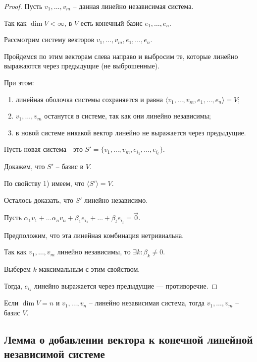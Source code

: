 \begin{proof}
    Пусть $v_1, \dots, v_m$ -- данная линейно независимая система.

    Так как $\dim V < \infty$, в $V$ есть конечный базис $e_1, \dots, e_n$.

    Рассмотрим систему векторов $v_1, \dots, v_m, e_1, \dots, e_n$.

    Пройдемся по этим векторам слева направо и выбросим те, которые линейно выражаются через предыдущие (не выброшенные).

    При этом:
    \begin{enumerate}[nosep, label=\arabic*)]
    \item линейная оболочка системы сохраняется и равна $\langle v_1, \dots, v_m, e_1, \dots, e_n \rangle = V$;
    \item $v_1, \dots, v_m$ останутся в системе, так как они линейно независимы;
    \item в новой системе никакой вектор линейно не выражается через предыдущие.
    \end{enumerate}

    Пусть новая система - это $S' = \{v_1, \dots, v_m, e_{i_1}, \dots, e_{i_t}\}$.

    Докажем, что $S'$ -- базис в $V$.

    По свойству 1) имеем, что $\langle S' \rangle = V$.

    Осталось доказать, что $S'$ линейно независимо.

    Пусть $\alpha_1 v_1 + \dots \alpha_n v_n + \beta_1 e_{i_1} + \dots + \beta_t e_{i_t} = \overrightarrow{0}$.

    Предположим, что эта линейная комбинация нетривиальна.

    Так как $v_1, \dots, v_m$ линейно независимы, то $\exists k : \beta_k \neq 0$.

    Выберем $k$ максимальным с этим свойством.

    Тогда, $e_{i_k}$ линейно выражается через предыдущие --- противоречие.
\end{proof}

\begin{corollary}
    Если $\dim V = n$ и $v_1, \dots, v_n$ -- линейно независимая система, тогда $v_1, \dots, v_m$ -- базис $V$.
\end{corollary}

\subsection{Лемма о добавлении вектора к конечной линейной независимой системе}

